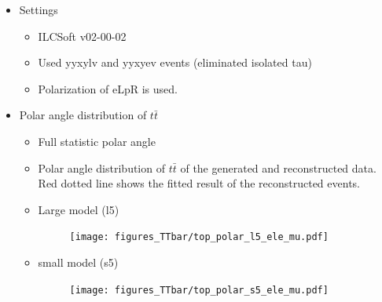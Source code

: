 \documentclass[preprint]{elsarticle}
\begin{document}
\begin{itemize}

\item Settings
  \begin{itemize}
  \item ILCSoft v02-00-02
  \item Used yyxylv and yyxyev events (eliminated isolated tau)
  \item Polarization of eLpR is used.
  \end{itemize}
  
\item Polar angle distribution of $t\bar{t}$
  \begin{itemize}
  \item Full statistic polar angle
  \item Polar angle distribution of $t\bar{t}$ of the generated and reconstructed data. Red dotted line shows the fitted result of the reconstructed events.
  \item Large model (l5)
  \begin{figure}[H]
  \centering
  \texttt{[image: figures\_TTbar/top\_polar\_l5\_ele\_mu.pdf]}
  \caption{}
  \label{fig:tt_l5_polar_angle}
  \end{figure}
  
  \begin{center}
  \end{center}

  \item small model (s5)
  \begin{figure}[H]
  \centering
  \texttt{[image: figures\_TTbar/top\_polar\_s5\_ele\_mu.pdf]}
  \caption{}
  \label{fig:tt_s5_polar_angle}
  \end{figure}
  \end{itemize}
  
  \begin{center}
  \end{center}


\end{itemize}
\end{document}
